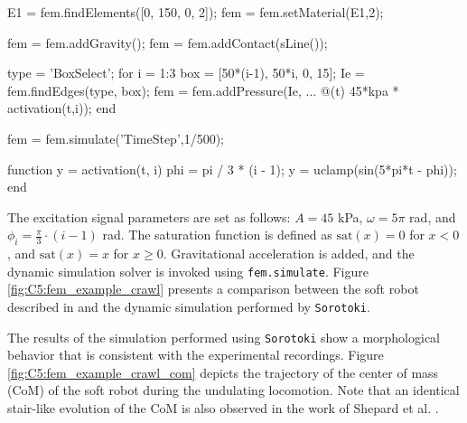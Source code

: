 \begin{example}
\begin{matlabcode}
E1  = fem.findElements([0, 150, 0, 2]);
fem = fem.setMaterial(E1,2);

fem = fem.addGravity();
fem = fem.addContact(sLine());

type = 'BoxSelect';
for i = 1:3
    box = [50*(i-1), 50*i, 0, 15];
    Ie  = fem.findEdges(type, box);
    fem = fem.addPressure(Ie, ...
      @(t) 45*kpa * activation(t,i));
end

fem = fem.simulate('TimeStep',1/500);

function y = activation(t, i)
    phi = pi / 3 * (i - 1);
    y = uclamp(sin(5*pi*t - phi));
end
\end{matlabcode}
\vfill
The excitation signal parameters are set as follows: $A = 45$ \si{\kilo \pascal}, $\omega = 5 \pi$ \si{\radian}, and $\phi_i = \frac{\pi}{3} \cdot (i-1)$ \si{\radian}. The saturation function is defined as $\textrm{sat}(x) = 0$ for $x < 0$, and $\textrm{sat}(x) = x$ for $x \geq 0$. Gravitational acceleration is added, and the dynamic simulation solver is invoked using \texttt{fem.simulate}. Figure \ref{fig:C5:fem_example_crawl} presents a comparison between the soft robot described in \cite{Shepherd2011Dec} and the dynamic simulation performed by \texttt{Sorotoki}.

The results of the simulation performed using \texttt{Sorotoki} show a morphological behavior that is consistent with the experimental recordings. Figure \ref{fig:C5:fem_example_crawl_com} depicts the trajectory of the center of mass (CoM) of the soft robot during the undulating locomotion. Note that an identical stair-like evolution of the CoM is also observed in the work of Shepard et al. \cite{Shepherd2011Dec}. 
\vfill
\end{example}

%

